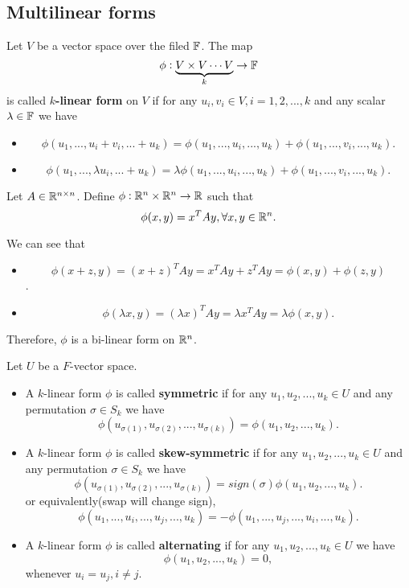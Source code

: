 \begin{refsection}
\subsection{Multilinear forms}
\begin{definition}
Let $V$ be a vector space over the filed $\mathbb{F}$. The map $$\phi: \underbrace{V\times V \cdots V}_{k}  \to \mathbb{F}$$
is called \textbf{$k$-linear form} on $V$ if for any $u_i,v_i\in V,i=1,2,...,k$ and any scalar $\lambda\in \mathbb{F}$ we have
\begin{itemize}
	\item $$\phi(u_1,...,u_i+v_i,...+u_k) = \phi(u_1,...,u_i,...,u_k) + \phi(u_1,...,v_i,...,u_k).$$
	\item $$\phi(u_1,...,\lambda u_i,...+u_k) = \lambda \phi(u_1,...,u_i,...,u_k) + \phi(u_1,...,v_i,...,u_k).$$
\end{itemize}	
\end{definition}

\begin{example}
Let $A\in \mathbb{R}^{n\times n}$. Define $\phi:\mathbb{R}^n\times \mathbb{R}^n\to \mathbb{R}$ such that
$$\phi(x,y) = x^TAy, \forall x,y\in \mathbb{R}^n.$$

We can see that
\begin{itemize}
	\item $$\phi(x+z,y) = (x+z)^TAy = x^TAy + z^TAy = \phi(x,y) + \phi(z,y)$$.
	\item $$\phi(\lambda x, y) = (\lambda x)^TAy = \lambda x^TAy = \lambda \phi(x,y).$$
\end{itemize}	

Therefore, $\phi$ is a bi-linear form on $\mathbb{R}^n$.
\end{example}


\begin{definition}
Let $U$ be a $F$-vector space.
\begin{itemize}
	\item A $k$-linear form $\phi$ is called \textbf{symmetric} if for any $u_1,u_2,...,u_k\in U$ and any permutation $\sigma\in S_k$ we have
	$$\phi(u_{\sigma(1)},u_{\sigma(2)},...,u_{\sigma(k)}) = \phi(u_{1},u_{2},...,u_{k}).$$
	\item A $k$-linear form $\phi$ is called \textbf{skew-symmetric} if for any $u_1,u_2,...,u_k\in U$ and any permutation $\sigma\in S_k$ we have
	$$\phi(u_{\sigma(1)},u_{\sigma(2)},...,u_{\sigma(k)}) = sign(\sigma)\phi(u_{1},u_{2},...,u_{k}).$$
	or equivalently(swap will change sign), 
	$$\phi(u_1,...,u_i,...,u_j,...,u_k) = -\phi(u_1,...,u_j,...,u_i,...,u_k).$$
	\item A $k$-linear form $\phi$ is called \textbf{alternating} if for any $u_1,u_2,...,u_k\in U$ we have
	$$\phi(u_{1},u_{2},...,u_{k}) = 0,$$
whenever $u_i=u_j,i\neq j.$	
\end{itemize}	
\end{definition}




\end{refsection}
